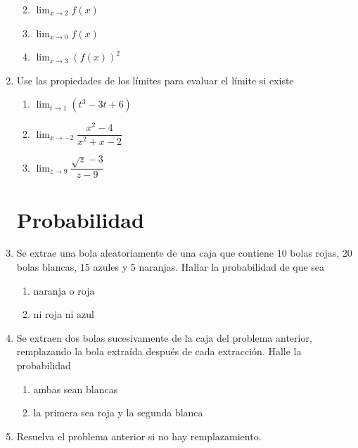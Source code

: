 \documentclass[letterpaper,fleqn]{article}
\begin{document}
\begin{enumerate}
\begin{enumerate}
\noanswer
\item $\displaystyle{\lim_{x\rightarrow 2}f(x)}$\noanswer
\item $\displaystyle{\lim_{x\rightarrow 0}f(x)}$\noanswer
\item $\displaystyle{\lim_{x\rightarrow 3}(f(x))^{2}}$\noanswer
 \end{enumerate}
 \item Use las propiedades de los límites para evaluar el límite si existe
 \begin{enumerate}
\item $\displaystyle{\lim_{t\rightarrow 1}(t^{3}-3t+6)}$ \noanswer
\item $\displaystyle{\lim_{x\rightarrow -2}\dfrac{x^{2}-4}{x^{2}+x-2}}$ \noanswer
\item $\displaystyle{\lim_{z\rightarrow 9}\dfrac{\sqrt{z}-3}{z-9}}$ \noanswer
 \end{enumerate}
 \section*{Probabilidad}
 \item Se extrae una bola aleatoriamente de una caja que contiene 10 bolas rojas, 20 bolas blancas, 15 azules y 5 naranjas. Hallar la probabilidad de que sea
 \begin{enumerate}
 \item naranja o roja \noanswer
 \item ni roja ni azul \noanswer
 \end{enumerate}
 \item Se extraen dos bolas sucesivamente de la caja del problema anterior, remplazando la bola extraída después de cada extracción. Halle la probabilidad
 \begin{enumerate}
 \item ambas sean blancas\noanswer
 \item la primera sea roja y la segunda blanca \noanswer
 \end{enumerate}
 \item Resuelva el problema anterior si no hay remplazamiento.\noanswer
\end{enumerate}
\end{document}
